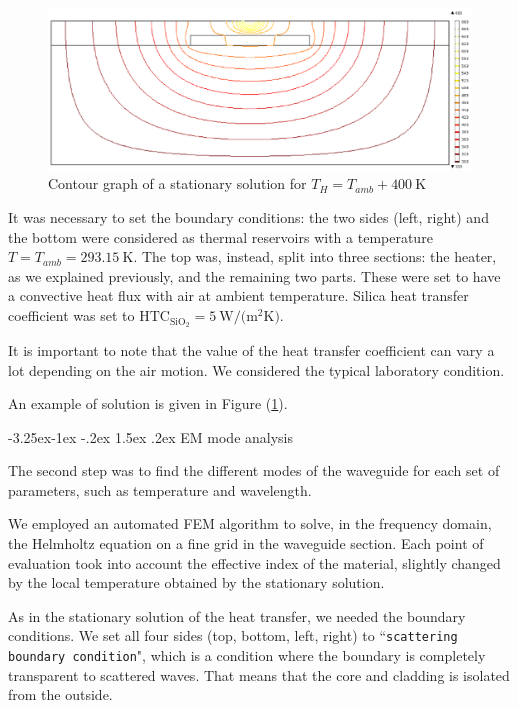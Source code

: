 \documentclass[12pt,a4paper,twoside]{article}
\makeatletter
\renewcommand\paragraph{
   \@startsection{paragraph}{4}{\z@}%
   {-3.25ex\@plus -1ex \@minus -.2ex}%
   {1.5ex \@plus .2ex}%
   {\normalfont\normalsize\bfseries}}
\makeatother
\begin{document}
\begin{figure}[!hb]
	\centering
	\includegraphics[width=1\textwidth]{thermal.pdf}
	\caption{Contour graph of a stationary solution for $T_H = T_{amb} + \SI{400}{\K}$}
	\label{fig_ex_thermal}
\end{figure}

It was necessary to set the boundary conditions: the two sides (left, right) and the bottom were considered as thermal reservoirs with a temperature $T = T_{amb} = \SI{293.15}{\K}$.
The top was, instead, split into three sections: the heater, as we explained previously, and the remaining two parts.
These were set to have a convective heat flux with air at ambient temperature.
Silica heat transfer coefficient was set to $\mathrm{HTC}_{\mathrm{SiO}_2} = \SI{5}{\W\per(\m^2\K)}$.

It is important to note that the value of the heat transfer coefficient can vary a lot depending on the air motion.
We considered the typical laboratory condition.

An example of solution is given in Figure (\ref{fig_ex_thermal}).

\paragraph{EM mode analysis}

The second step was to find the different modes of the waveguide for each set of parameters, such as temperature and wavelength.

We employed an automated FEM algorithm to solve, in the frequency domain, the Helmholtz equation on a fine grid in the waveguide section.
Each point of evaluation took into account the effective index of the material, slightly changed by the local temperature obtained by the stationary solution.

As in the stationary solution of the heat transfer, we needed the boundary conditions.
We set all four sides (top, bottom, left, right) to ``\texttt{scattering boundary condition}", which is a condition where the boundary is completely transparent to scattered waves.
That means that the core and cladding is isolated from the outside.
\end{document}
